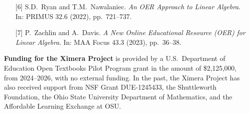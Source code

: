 \documentclass[twocolumn]{article}
\begin{document}
\begin{xframe}
\begin{itemize}
        {\tt  https://go.osu.edu/wo}
        \item[{[6]}]S.D.\ Ryan and T.M.\ Nawalaniec. \textit{An OER Approach to
            Linear Algebra}. In: PRIMUS 32.6 (2022), pp.\ 721--737.\\
        \item[{[7]}] P.\ Zachlin and A.\ Davis. \textit{A New Online
            Educational Resource (OER)
            for Linear Algebra}. In: MAA Focus 43.3 (2023), pp.\ 36--38.\\
    \end{itemize}
\end{xframe}

\vspace{.2cm}

\begin{xframe}
    \textbf{Funding for the Ximera Project} is provided by
    a U.S.\ Department of Education Open Textbooks Pilot Program grant in the
    amount of \$2,125,000, from 2024--2026, with no external funding. In the
    past, the Ximera Project has
    also received support from NSF Grant DUE-1245433, the Shuttleworth
    Foundation, the Ohio State University
    Department of Mathematics, and the Affordable Learning Exchange at OSU.
\end{xframe}

\vspace{2cm}
\end{document}
